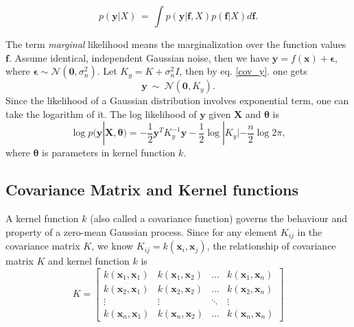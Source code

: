 \documentclass[11pt,a4paper]{article}
\theoremstyle{definition}
\numberwithin{equation}{section}
\let\vec\mathbf
\begin{document}
	\begin{equation}
	p(\vec y|X)\, = \, \int p(\vec y|\vec f, X)p(\vec f|X)d\vec f.
	\end{equation}
	
	The term \textit{marginal} likelihood means the marginalization over the function values $\vec f$. Assume identical, independent Gaussian noise, then we have $\vec y = f(\vec x) + \vec\epsilon$, where $\vec\epsilon \sim \mathcal{N}(\vec 0, \sigma^2_n)$. Let $K_y = K + \sigma^2_nI$, then by eq. \ref{cov_y}. one gets
	\begin{equation}
	\vec y \  \sim \ \mathcal N \left(\vec 0,K_y  \right).
	\end{equation}
	Since the likelihood of a Gaussian distribution involves exponential term, one can take the logarithm of it. The log likelihood of $\vec y$ given $\vec X$ and $\vec \theta$ is 
	\begin{equation}\label{log-likelihood}
	\log p(\vec y|\vec X, \vec \theta)=-\frac{1}{2}\vec y^T K_y^{-1}\vec y-\frac{1}{2}\log|K_y| - \frac{n}{2}\log 2\pi,
	\end{equation}
	where $\vec \theta$ is parameters in kernel function $k$.
	
	\subsection{Covariance Matrix and Kernel functions}\label{subsec:kernel_func}
	A kernel function $k$ (also called a covariance function) governs the behaviour and property of a zero-mean Gaussian process. Since for any element $K_{ij}$ in the covariance matrix $K$, we know $K_{ij} = k(\vec x_i,\vec x_j)$, the relationship of covariance matrix $K$ and kernel function $k$ is
	\begin{equation}\label{cov_mat}
	K = 
	\begin{bmatrix}
	k(\vec x_1,\vec x_1) & k(\vec x_1,\vec x_2)& \dots& k(\vec x_1,\vec x_n)\\
	k(\vec x_2,\vec x_1) & k(\vec x_2,\vec x_2)& \dots& k(\vec x_2,\vec x_n)\\
	\vdots & \vdots  & \ddots & \vdots \\
	k(\vec x_n,\vec x_1) & k(\vec x_n,\vec x_2)& \dots& k(\vec x_n,\vec x_n)
	\end{bmatrix}
	\end{equation}
	
	
\end{document}
